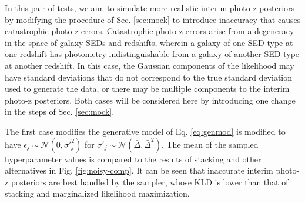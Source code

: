 \documentclass[preprint]{aastex}
\begin{document}
In this pair of tests, we aim to simulate more realistic interim photo-z 
posteriors by modifying the procedure of Sec. \ref{sec:mock} to introduce 
inaccuracy that causes catastrophic photo-z errors.  Catastrophic photo-z 
errors arise from a degeneracy in the space of galaxy SEDs and redshifts, 
wherein a galaxy of one SED type at one redshift has photometry 
indistinguishable from a galaxy of another SED type at another redshift.  In 
this case, the Gaussian components of the likelihood may have standard 
deviations that do not correspond to the true standard deviation used to 
generate the data, or there may be multiple components to the interim photo-z 
posteriors.  Both cases will be considered here by introducing one change in 
the steps of Sec. \ref{sec:mock}.  

The first case modifies the generative model of Eq. \ref{eq:genmod} is modified 
to have $\epsilon_{j}\sim\mathcal{N}(0,\sigma'^{2}_{j})$ for 
$\sigma'_{j}\sim\mathcal{N}(\bar{\Delta},\bar{\Delta}^{2})$.  The mean of the 
sampled hyperparameter values is compared to the results of stacking and other 
alternatives in Fig. \ref{fig:noisy-comp}.  It can be seen that inaccurate 
interim photo-z posteriors are best handled by the sampler, whose KLD is lower 
than that of stacking and marginalized likelihood maximization.

%
\end{document}
